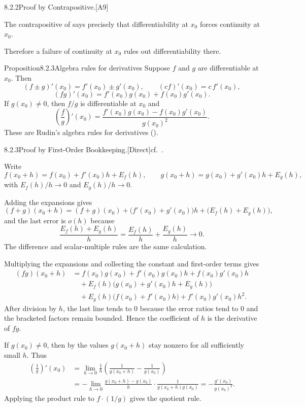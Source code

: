 \documentclass[main.tex]{subfiles}
\begin{document}
\begin{Prf}{8.2.2}{Proof by Contrapositive.}{[A9]}
\item The contrapositive of  says precisely that differentiability at $x_0$
  forces continuity at $x_0$.
\item Therefore a failure of continuity at $x_0$ rules out differentiability there.
\end{Prf}

\begin{Obj}{Proposition}{8.2.3}{Algebra rules for derivatives}
Suppose $f$ and $g$ are differentiable at $x_0$. Then
\[
  (f\pm g)'(x_0)=f'(x_0)\pm g'(x_0),
  \qquad
  (cf)'(x_0)=c\,f'(x_0),
\]
\[
  (fg)'(x_0)=f'(x_0)g(x_0)+f(x_0)g'(x_0).
\]
If $g(x_0)\ne0$, then $f/g$ is differentiable at $x_0$ and
\[
  \left(\frac{f}{g}\right)'(x_0)
  =
  \frac{f'(x_0)g(x_0)-f(x_0)g'(x_0)}{g(x_0)^2}.
\]
These are Rudin's algebra rules for derivatives ().
\end{Obj}

\begin{Prf}{8.2.3}{Proof by First-Order Bookkeeping.}{[Direct]\quad cf.\ .}
\item Write
  \[
    f(x_0+h)=f(x_0)+f'(x_0)h+E_f(h),
    \qquad
    g(x_0+h)=g(x_0)+g'(x_0)h+E_g(h),
  \]
  with $E_f(h)/h\to0$ and $E_g(h)/h\to0$.
\item Adding the expansions gives
  \[
    (f+g)(x_0+h)
    =
    (f+g)(x_0)+\bigl(f'(x_0)+g'(x_0)\bigr)h+\bigl(E_f(h)+E_g(h)\bigr),
  \]
  and the last error is $o(h)$ because
  \[
    \frac{E_f(h)+E_g(h)}{h}
    =
    \frac{E_f(h)}{h}+\frac{E_g(h)}{h}\longrightarrow0 .
  \]
  The difference and scalar-multiple rules are the same calculation.
\item Multiplying the expansions and collecting the constant and first-order terms gives
  \[
  \begin{aligned}
    (fg)(x_0+h)
    &=f(x_0)g(x_0)
      +f'(x_0)g(x_0)h
      +f(x_0)g'(x_0)h\\
    &\quad
      +E_f(h)\bigl(g(x_0)+g'(x_0)h+E_g(h)\bigr)\\
    &\quad
      +E_g(h)\bigl(f(x_0)+f'(x_0)h\bigr)
      +f'(x_0)g'(x_0)h^2 .
  \end{aligned}
  \]
  After division by $h$, the last line tends to $0$ because the error ratios tend to $0$
  and the bracketed factors remain bounded. Hence the coefficient of $h$ is the derivative
  of $fg$.
\item If $g(x_0)\ne0$, then by  the values $g(x_0+h)$ stay nonzero for all
  sufficiently small $h$. Thus
  \[
  \begin{aligned}
    \left(\frac1g\right)'(x_0)
    &=
    \lim_{h\to0}\frac{1}{h}
    \left(\frac1{g(x_0+h)}-\frac1{g(x_0)}\right)\\
    &=
    -\lim_{h\to0}
      \frac{g(x_0+h)-g(x_0)}{h}\cdot
      \frac1{g(x_0+h)g(x_0)}
     =
     -\frac{g'(x_0)}{g(x_0)^2}.
  \end{aligned}
  \]
  Applying the product rule to $f\cdot(1/g)$ gives the quotient rule.
\end{Prf}
\end{document}
